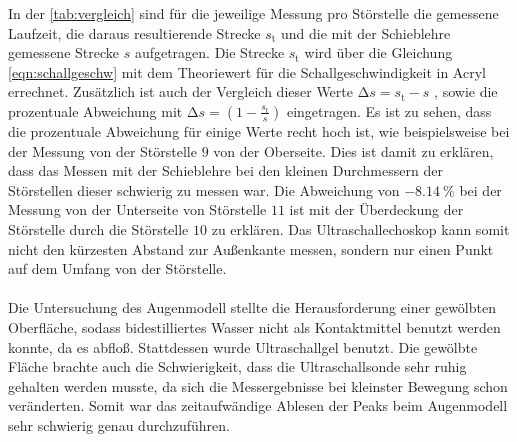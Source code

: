 \noindent In der \autoref{tab:vergleich} sind für die jeweilige Messung pro Störstelle die gemessene Laufzeit, die daraus resultierende Strecke $s_{\text{t}}$ und 
die mit der Schieblehre gemessene Strecke $s$ aufgetragen. Die Strecke $s_{\text{t}}$ wird über die Gleichung \eqref{eqn:schallgeschw} mit dem Theoriewert für 
die Schallgeschwindigkeit in Acryl errechnet. Zusätzlich ist auch der Vergleich dieser Werte $ \increment s = s_{\text{t}} - s $ , sowie die 
prozentuale Abweichung mit $ \increment s = (1-\frac{s_{\text{t}}}{s})$ eingetragen.
Es ist zu sehen, dass die prozentuale Abweichung für einige Werte recht hoch ist, wie beispielsweise bei der Messung von der Störstelle $9$ von der Oberseite.
Dies ist damit zu erklären, dass das Messen mit der Schieblehre bei den kleinen Durchmessern der Störstellen dieser schwierig zu messen war. 
Die Abweichung von $\SI{-8.14}{\percent}$ bei der Messung von der Unterseite von Störstelle $11$ ist mit der Überdeckung der Störstelle durch die Störstelle $10$ 
zu erklären. Das Ultraschallechoskop kann somit nicht den kürzesten Abstand zur Außenkante messen, sondern nur einen Punkt auf dem Umfang von der Störstelle. \\
\\


\noindent Die Untersuchung des Augenmodell stellte die Herausforderung einer gewölbten Oberfläche, sodass bidestilliertes Wasser nicht als Kontaktmittel benutzt 
werden konnte, da es abfloß. Stattdessen wurde Ultraschallgel benutzt. Die gewölbte Fläche brachte auch die Schwierigkeit, dass die Ultraschallsonde sehr ruhig 
gehalten werden musste, da sich die Messergebnisse bei kleinster Bewegung schon veränderten. Somit war das zeitaufwändige Ablesen der Peaks beim Augenmodell
sehr schwierig genau durchzuführen. 